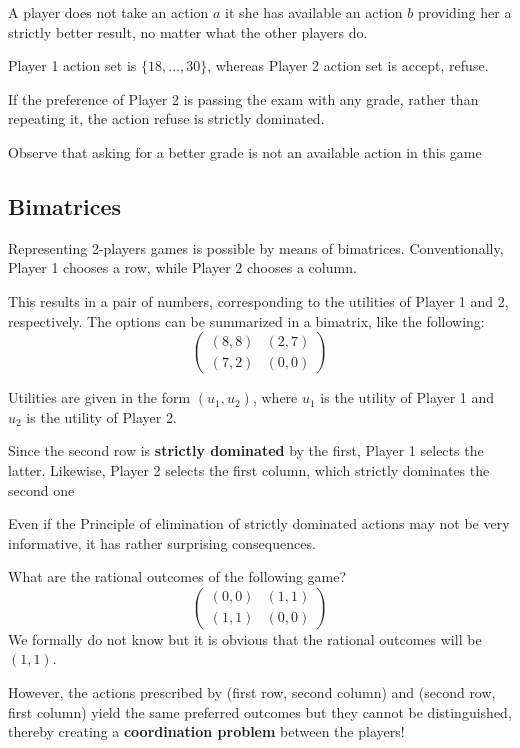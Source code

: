 \documentclass[../main.tex]{subfiles}
\begin{document}
A player does not take an action $a$ it she has available an action $b$ providing her a
strictly better result, no matter what the other players do.

\begin{example}
    Player 1 action set is $\{18, \ldots, 30\}$, whereas Player 2 action set is {accept, refuse}.

    If the preference of Player 2 is passing the exam with any grade, rather than repeating it, the action refuse is strictly dominated.

    Observe that asking for a better grade is not an available action in this game
\end{example}

\subsection{Bimatrices}
Representing 2-players games is possible by means of bimatrices. Conventionally, Player 1 chooses a row, while Player 2 chooses a column.

This results in a pair of numbers, corresponding to the utilities of Player 1 and 2,
respectively. The options can be summarized in a bimatrix, like the following:
\[
    \begin{pmatrix}
        (8,8) & (2,7) \\
        (7,2) & (0,0)
    \end{pmatrix}
\]

Utilities are given in the form $(u_1, u_2)$, where $u_1$ is the utility of Player 1 and $u_2$ is the utility of Player 2.

Since the second row is \textbf{strictly dominated} by the first, Player 1 selects the latter. Likewise, Player 2 selects the first column, which strictly dominates the second one

Even if the Principle of elimination of strictly dominated actions may not be very informative, it has rather surprising consequences.

\begin{example}
    What are the rational outcomes of the following game?
    \[
        \begin{pmatrix}
            (0,0) & (1,1) \\
            (1,1) & (0,0)
        \end{pmatrix}
    \]
    We formally do not know but it is obvious that the rational outcomes will be $(1, 1)$.

    However, the actions prescribed by (first row, second column) and (second row, first column) yield the same preferred outcomes but they cannot be distinguished, thereby creating a \textbf{coordination problem} between the players!
\end{example}
\end{document}
